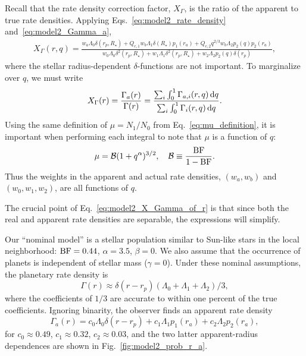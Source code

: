 Recall that the rate density correction factor, $X_\Gamma$, is the ratio of 
the apparent to true rate densities.
Applying Eqs.~\ref{eq:model2_rate_density} and~\ref{eq:model2_Gamma_a},
\begin{align}
X_\Gamma(r,q)
=
\frac{
    w_a \Lambda_0 \delta(r_p,R_\star)
    +
    Q_{c,1} w_b \Lambda_1 \delta(R_\star) p_1(r_a)
    +
    Q_{c,2} q^{2/3} w_b \Lambda_2 p_2(q) p_2(r_a)
}
{
w_0 \Lambda_0 \delta^2(r_p,R_\star) +
w_1 \Lambda_1 \delta^2(r_p,R_\star) +
w_2 \Lambda_2 p_2(q) \delta(r_p)
},
\label{eq:model2_X_Gamma}
\end{align}
where the stellar radius-dependent $\delta$-functions are not important.
To marginalize over $q$, we must write
\begin{equation}
X_\Gamma(r) = \frac{\Gamma_a(r)}{\Gamma(r)}
= \frac{\sum_i \int_0^1 \Gamma_{a,i}(r,q) \,{\rm d}q}
{\sum_i \int_0^1 \Gamma_{i}(r,q) \,{\rm d}q}.
\label{eq:model2_X_Gamma_of_r}
\end{equation}
Using the same definition of $\mu = N_1/N_0$ from Eq.~\ref{eq:mu_definition}, 
it is important when performing each integral to note that $\mu$ is a function 
of $q$:
\begin{equation}
\mu = \mathcal{B} (1+q^\alpha)^{3/2},
\quad \mathcal{B} \equiv \frac{{\rm BF}}{1 - {\rm BF}} .
\end{equation}
Thus the weights in the apparent and actual rate densities, $(w_a,w_b)$ and 
$(w_0,w_1,w_2)$, are all functions of $q$.

The crucial point of Eq.~\ref{eq:model2_X_Gamma_of_r} is that since both the 
real and apparent rate densities are separable, the expressions will simplify.

Our ``nominal model'' is a stellar population similar to Sun-like stars in the 
local neighborhood:
${\rm BF}=0.44$, $\alpha=3.5$, $\beta=0$.
We also assume that the occurrence of planets is independent of stellar mass 
($\gamma=0$).
Under these nominal assumptions, the planetary rate density is
\begin{equation}
\Gamma(r) \approx \delta(r-r_p) \left( \Lambda_0 + \Lambda_1 + 
\Lambda_2 \right) / 3,
\label{eq:model2_Gamma_r}
\end{equation}
where the coefficients of $1/3$ are accurate to within one percent of the true 
coefficients.
Ignoring binarity, the observer finds an apparent rate density
\begin{equation}
\Gamma_a(r) = c_0 \Lambda_0 \delta(r-r_p)
             +c_1 \Lambda_1 p_1(r_a)
             +c_2 \Lambda_2 p_2(r_a),
\label{eq:model2_Gamma_a_r}
\end{equation}
for $c_0\approx 0.49$, $c_1\approx 0.32$, $c_2\approx 0.03$, and the two 
latter apparent-radius dependences are shown in Fig.~\ref{fig:model2_prob_r_a}.

